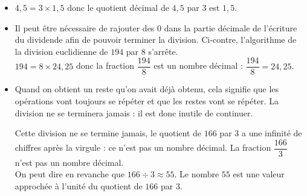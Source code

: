 \begin{Exemples}
\begin{minipage}[c]{0.55\textwidth}
\begin{itemize}[label=\textcolor{Couleur8}{$\bullet$}]
\item $4,5 = 3 \times 1,5$ donc le quotient décimal de $4,5$ par $3$ est $1,5$.
\item Il peut être nécessaire de rajouter des $0$ dans la partie décimale de l'écriture du dividende afin de pouvoir terminer la division. Ci-contre, l'algorithme de la division euclidienne de $194$ par $8$ s'arrête.\\
$194 = 8 \times 24,25$ donc la fraction $\dfrac{194}{8}$ est un nombre décimal : $\dfrac{194}{8} = 24,25$.
\end{itemize}
\end{minipage} \hfill \begin{minipage}[c]{0.45\textwidth}
\begin{center}
\end{center}
\end{minipage}

\begin{itemize}[label=\textcolor{Couleur8}{$\bullet$}]
\item Quand on obtient un reste qu'on avait déjà obtenu, cela signifie que les opérations vont toujours se répéter et que les restes vont se répéter. La division ne se terminera jamais : il est donc inutile de continuer.\\


\begin{center}
\end{center}

Cette division ne se termine jamais, le quotient de $166$ par $3$ a une infinité de chiffres après la virgule : ce n'est pas un nombre décimal. La fraction $\dfrac{166}{3}$ n'est pas un nombre décimal.\\
On peut dire en revanche que $166 \div 3 \approx 55$. Le nombre $55$ est une valeur approchée à l'unité du quotient de $166$ par $3$.
\end{itemize}
\end{Exemples}

